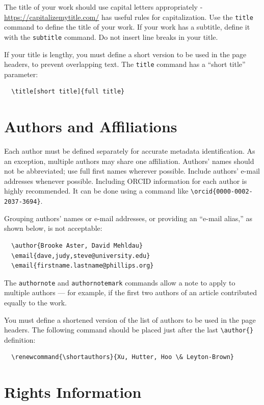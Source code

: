 \documentclass[manuscript, screen, review]{jair}
\begin{document}
The title of your work should use capital letters appropriately -
\url{https://capitalizemytitle.com/} has useful rules for
capitalization. Use the {\verb|title|} command to define the title of
your work. If your work has a subtitle, define it with the
{\verb|subtitle|} command.  Do not insert line breaks in your title.

If your title is lengthy, you must define a short version to be used
in the page headers, to prevent overlapping text. The \verb|title|
command has a ``short title'' parameter:
\begin{verbatim}
  \title[short title]{full title}
\end{verbatim}

\section{Authors and Affiliations}

Each author must be defined separately for accurate metadata
identification.  As an exception, multiple authors may share one
affiliation. Authors' names should not be abbreviated; use full first
names wherever possible. Include authors' e-mail addresses whenever
possible. Including ORCID information for each author is highly recommended. It can be done using a command like \verb|\orcid{0000-0002-2037-3694}|.

Grouping authors' names or e-mail addresses, or providing an ``e-mail
alias,'' as shown below, is not acceptable:
\begin{verbatim}
  \author{Brooke Aster, David Mehldau}
  \email{dave,judy,steve@university.edu}
  \email{firstname.lastname@phillips.org}
\end{verbatim}

The \verb|authornote| and \verb|authornotemark| commands allow a note
to apply to multiple authors --- for example, if the first two authors
of an article contributed equally to the work.

You must define a shortened version of
the list of authors to be used in the page headers. The following command should be placed just after
the last \verb|\author{}| definition:
\begin{verbatim}
  \renewcommand{\shortauthors}{Xu, Hutter, Hoo \& Leyton-Brown}
\end{verbatim}

\section{Rights Information}
\end{document}
